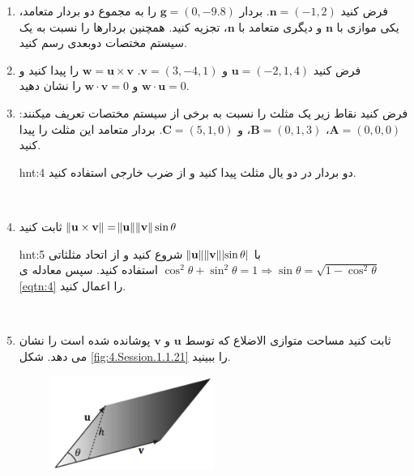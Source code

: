 {\begin{spacing}{1.5}
\begin{enumerate}
\begin{hint}{hnt:3}
            \end{hint}
            \\
            \item {فرض کنید $\textbf{n}=(-1,2)$. بردار $\textbf{g}=(0,-9.8)$ را به مجموع دو بردار متعامد، یکی موازی با $\textbf{n}$ و دیگری متعامد با $\textbf{n}$، تجزیه کنید. همچنین بردارها را نسبت به یک سیستم مختصات دوبعدی رسم کنید.}
            \\
            \item {فرض کنید $\textbf{u}=(-2,1,4)$ و $\textbf{v}=(3,-4,1)$. $\textbf{w}=\textbf{u}\times\textbf{v}$ را پیدا کنید و $\textbf{w}\cdot\textbf{u}=0$ و $\textbf{w}\cdot\textbf{v}=0$ را نشان دهید.}
            \\
            \item {فرض کنید نقاط زیر یک مثلث را نسبت به برخی از سیستم مختصات تعریف میکنند:
                $\textbf{A}=(0,0,0)$، $\textbf{B}=(0,1,3)$، و $\textbf{C}=(5,1,0)$. بردار متعامد این مثلث را پیدا کنید.}
            \begin{hint}{hnt:4}
                \Large
                دو بردار در دو یال مثلث پیدا کنید و از ضرب خارجی استفاده کنید.
            \end{hint}
            \\
            \item {ثابت کنید $\norm{\textbf{u}\times\textbf{v}}=\norm{\textbf{u}}\norm{\textbf{v}}\sin\theta$}
            \begin{hint}{hnt:5}
                \Large
                با $\norm{\textbf{u}}\norm{\textbf{v}}\abs{\sin\theta}$ شروع کنید و از اتحاد مثلثاتی $\cos^2\theta+\sin^2\theta=1\Longrightarrow\sin\theta=\sqrt{\displaystyle 1-\cos^2\theta}$ استفاده کنید. سپس معادله ی \ref{eqtn:4} را اعمال کنید.
            \end{hint}
            \\
            \item {ثابت کنید  مساحت متوازی الاضلاع که توسط $\textbf{u}$ و $\textbf{v}$ پوشانده شده است را نشان می دهد. شکل \ref{fig:4.Session.1.1.21} را ببینید.}
            \begin{figure}[H]
                \centering
                \setlength{\belowcaptionskip}{-10pt}
                \includegraphics[width=0.5\textwidth]{Images/4/4.Session.1.1.21}

\end{figure}
\end{enumerate}
\end{spacing}}
